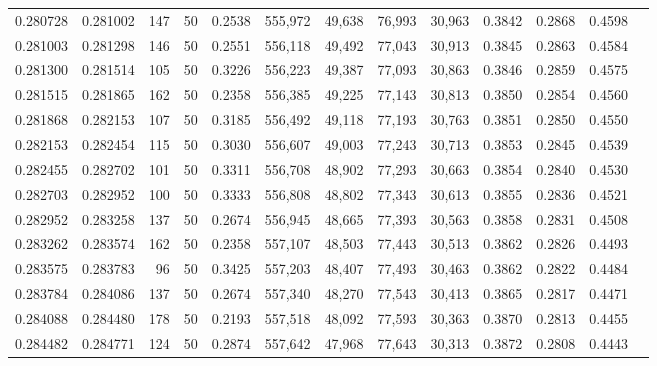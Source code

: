 \begin{tabular}{rrrrrrrrrrrrr}
0.280728 & 0.281002 &   147 &  50 &                                     0.2538 & 555,972 &  49,638 &  76,993 &  30,963 & 0.3842 & 0.2868 & 0.4598 \\
0.281003 & 0.281298 &   146 &  50 &                                     0.2551 & 556,118 &  49,492 &  77,043 &  30,913 & 0.3845 & 0.2863 & 0.4584 \\
0.281300 & 0.281514 &   105 &  50 &                                     0.3226 & 556,223 &  49,387 &  77,093 &  30,863 & 0.3846 & 0.2859 & 0.4575 \\
0.281515 & 0.281865 &   162 &  50 &                                     0.2358 & 556,385 &  49,225 &  77,143 &  30,813 & 0.3850 & 0.2854 & 0.4560 \\
0.281868 & 0.282153 &   107 &  50 &                                     0.3185 & 556,492 &  49,118 &  77,193 &  30,763 & 0.3851 & 0.2850 & 0.4550 \\
0.282153 & 0.282454 &   115 &  50 &                                     0.3030 & 556,607 &  49,003 &  77,243 &  30,713 & 0.3853 & 0.2845 & 0.4539 \\
0.282455 & 0.282702 &   101 &  50 &                                     0.3311 & 556,708 &  48,902 &  77,293 &  30,663 & 0.3854 & 0.2840 & 0.4530 \\
0.282703 & 0.282952 &   100 &  50 &                                     0.3333 & 556,808 &  48,802 &  77,343 &  30,613 & 0.3855 & 0.2836 & 0.4521 \\
0.282952 & 0.283258 &   137 &  50 &                                     0.2674 & 556,945 &  48,665 &  77,393 &  30,563 & 0.3858 & 0.2831 & 0.4508 \\
0.283262 & 0.283574 &   162 &  50 &                                     0.2358 & 557,107 &  48,503 &  77,443 &  30,513 & 0.3862 & 0.2826 & 0.4493 \\
0.283575 & 0.283783 &    96 &  50 &                                     0.3425 & 557,203 &  48,407 &  77,493 &  30,463 & 0.3862 & 0.2822 & 0.4484 \\
0.283784 & 0.284086 &   137 &  50 &                                     0.2674 & 557,340 &  48,270 &  77,543 &  30,413 & 0.3865 & 0.2817 & 0.4471 \\
0.284088 & 0.284480 &   178 &  50 &                                     0.2193 & 557,518 &  48,092 &  77,593 &  30,363 & 0.3870 & 0.2813 & 0.4455 \\
0.284482 & 0.284771 &   124 &  50 &                                     0.2874 & 557,642 &  47,968 &  77,643 &  30,313 & 0.3872 & 0.2808 & 0.4443 \\

\end{tabular}
